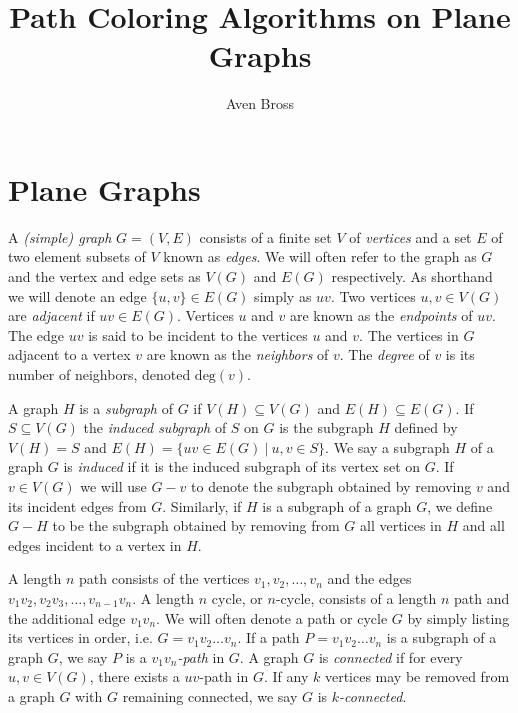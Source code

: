 \documentclass[letterpaper, 12pt]{amsart}
\title{Path Coloring Algorithms on Plane Graphs}
\author{Aven Bross}
\theoremstyle{definition}
\theoremstyle{definition}
\theoremstyle{thm}
\theoremstyle{definition}
\begin{document}
\maketitle

\section{Plane Graphs}

A \textit{(simple) graph} $G=(V,E)$ consists of a finite set $V$ of
\textit{vertices} and a set $E$ of two element subsets of $V$ known as
\textit{edges}. We will often refer to the graph as $G$ and the vertex and
edge sets as $V(G)$ and $E(G)$ respectively. As shorthand we will denote an edge
$\{u,v\}\in E(G)$ simply as $uv$. Two vertices $u,v\in V(G)$ are
\textit{adjacent} if $uv\in E(G)$. Vertices $u$ and $v$ are known as the
\textit{endpoints} of $uv$. The edge $uv$ is said to be incident to the vertices
$u$ and $v$. The vertices in $G$ adjacent to a vertex $v$ are known as
the \textit{neighbors} of $v$. The \textit{degree} of $v$ is its number of
neighbors, denoted $\text{deg}(v)$.

A graph $H$ is a \textit{subgraph} of $G$ if $V(H)\subseteq V(G)$ and
$E(H)\subseteq E(G)$. If $S\subseteq V(G)$ the \textit{induced subgraph} of
$S$ on $G$ is the subgraph $H$ defined by $V(H)=S$ and
$E(H)=\{uv\in E(G) \ | \ u,v\in S\}$. We say a subgraph $H$ of a graph $G$ is
\textit{induced} if it is the induced subgraph of its vertex set on $G$. If
$v\in V(G)$ we will use $G-v$ to denote the subgraph obtained by removing $v$
and its incident edges from $G$. Similarly, if $H$ is a subgraph of a graph $G$,
we define $G-H$ to be the subgraph obtained by removing from $G$ all vertices in
$H$ and all edges incident to a vertex in $H$.

A length $n$ path consists of the vertices $v_1,v_2,\ldots,v_n$ and the edges $v_1v_2,
v_2v_3,\ldots,v_{n-1}v_n$. A length $n$ cycle, or $n$-cycle, consists of a
length $n$ path and the additional edge $v_1v_n$. We will often denote a path
or cycle $G$ by simply listing its vertices in order, i.e. $G=v_1v_2\ldots v_n$.
If a path $P=v_1v_2\ldots v_n$ is a subgraph of a graph $G$, we say $P$ is a
\textit{$v_1v_n$-path} in $G$. A graph $G$ is \textit{connected} if for every
$u,v\in V(G)$, there exists a $uv$-path in $G$. If any $k$ vertices may be
removed from a graph $G$ with $G$ remaining connected, we say $G$ is
\textit{$k$-connected}.
\end{document}
